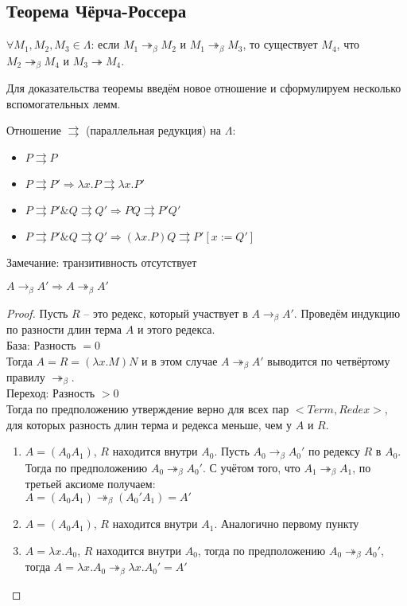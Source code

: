 \subsection{Теорема Чёрча-Россера}
\label{sec-2-4}
\begin{theorem}
$\forall M_1, M_2, M_3 \in \Lambda$:
если $M_1 \twoheadrightarrow_\beta M_2$ и $M_1 \twoheadrightarrow_\beta M_3$,
то существует $M_4$, что $M_2 \twoheadrightarrow_\beta M_4$ и $M_3
\twoheadrightarrow M_4$.
\end{theorem}
Для доказательства теоремы введём новое отношение и сформулируем несколько
вспомогательных лемм.
\begin{definition}
Отношение $\rightrightarrows$ (параллельная редукция) на $\Lambda$:
\begin{itemize}
\item $P \rightrightarrows P$
\item $P \rightrightarrows P' \Rightarrow \lambda x . P \rightrightarrows
\lambda x . P'$
\item $P \rightrightarrows P' \& Q \rightrightarrows Q' \Rightarrow
P Q \rightrightarrows P' Q'$
\item $P \rightrightarrows P' \& Q \rightrightarrows Q' \Rightarrow
(\lambda x . P) Q \rightrightarrows P'[x:=Q']$
\end{itemize}
Замечание: транзитивность отсутствует
\end{definition}
\begin{lemma}
$A \to_\beta A' \Rightarrow A \twoheadrightarrow_\beta A'$
\end{lemma}
\begin{proof}
Пусть $R$ -- это редекс, который участвует в $A \to_\beta A'$. Проведём индукцию
по разности длин терма $A$ и этого редекса. \\
База: Разность $= 0$ \\
Тогда $A = R = (\lambda x . M) N$ и в этом случае $A \twoheadrightarrow_\beta
A'$ выводится по четвёртому правилу $\twoheadrightarrow_\beta$. \\
Переход: Разность $> 0$ \\
Тогда по предположению утверждение верно для всех пар $<Term, Redex>$, 
для которых разность длин терма и редекса меньше, чем у $A$ и $R$.
\begin{enumerate}
\item $A = (A_0 A_1)$, $R$ находится внутри $A_0$. Пусть $A_0 \to_\beta A_0'$
по редексу $R$ в $A_0$. Тогда по предположению $A_0 \twoheadrightarrow_\beta A_0'$.
С учётом того, что $A_1 \twoheadrightarrow_\beta A_1$, по третьей аксиоме
получаем: \\
$A = (A_0 A_1) \twoheadrightarrow_\beta (A_0' A_1) = A'$
\item $A = (A_0 A_1)$, $R$ находится внутри $A_1$. Аналогично первому пункту
\item $A = \lambda x . A_0$, $R$ находится внутри $A_0$, тогда по предположению
$A_0 \twoheadrightarrow_\beta A_0'$, тогда $A = \lambda x . A_0 
\twoheadrightarrow_\beta \lambda x . A_0' = A'$
\end{enumerate}
\end{proof}
